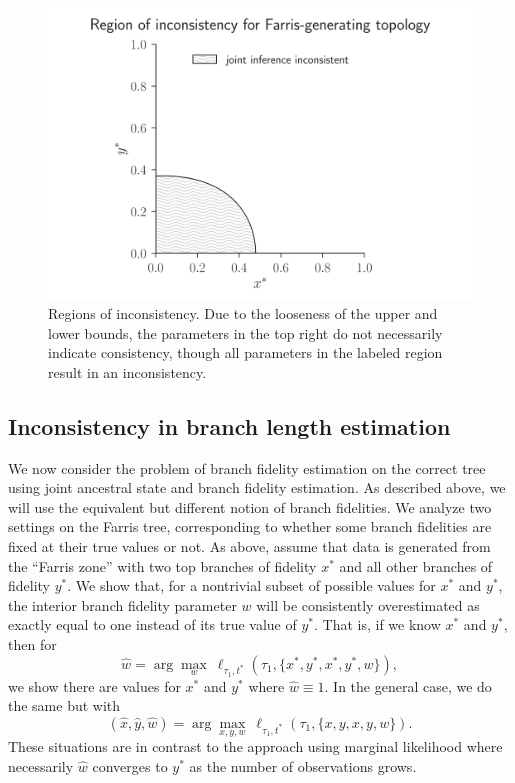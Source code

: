 \documentclass{article}
\begin{document}
\begin{figure}
\centering
\includegraphics[width=\textwidth]{topology-inconsistency-inkscape}
\caption{
    Regions of inconsistency.
    Due to the looseness of the upper and lower bounds, the parameters in the top right do not necessarily indicate consistency, though all parameters in the labeled region result in an inconsistency.
}
\label{fig:inconsistency-farris}
\end{figure}

\subsection*{Inconsistency in branch length estimation}

We now consider the problem of branch fidelity estimation on the correct tree using joint ancestral state and branch fidelity estimation.
As described above, we will use the equivalent but different notion of branch fidelities.
We analyze two settings on the Farris tree, corresponding to whether some branch fidelities are fixed at their true values or not.
As above, assume that data is generated from the ``Farris zone'' with two top branches of fidelity $x^*$ and all other branches of fidelity $y^*$.
We show that, for a nontrivial subset of possible values for $x^*$ and $y^*$, the interior branch fidelity parameter $w$ will be consistently overestimated as exactly equal to one instead of its true value of $y^*$.
That is, if we know $x^*$ and $y^*$, then for
$$
\hat{w} = \arg\max_{w} \ \ell_{\tau_1,t^*}(\tau_1, \{x^*,y^*,x^*,y^*,w\}),
$$
we show there are values for $x^*$ and $y^*$ where $\hat{w}\equiv 1$.
In the general case, we do the same but with
$$
(\hat{x}, \hat{y}, \hat{w}) = \arg\max_{x,y,w} \ \ell_{\tau_1,t^*}(\tau_1, \{x,y,x,y,w\}).
$$
These situations are in contrast to the approach using marginal likelihood where necessarily $\hat{w}$ converges to $y^*$ as the number of observations grows.
\end{document}
